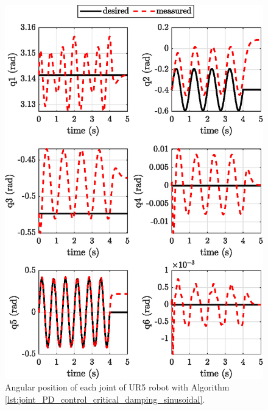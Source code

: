 \begin{figure}[H]
    \centering
    \includegraphics{images/act_1.5_sin/joint_position.eps}
    \caption{Angular position of each joint of UR5 robot with Algorithm \ref{lst:joint_PD_control_critical_damping_sinusoidal}.}
    \label{fig:act_1.5_sin_joint_position}
\end{figure}


